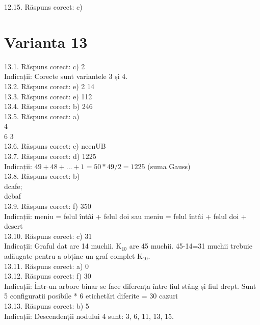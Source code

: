 12.15. Răspuns corect: c)\\

\section*{Varianta 13}

13.1. Răspuns corect: c) 2\\
Indicații: Corecte sunt variantele 3 și 4.\\

13.2. Răspuns corect: e) 2 14\\

13.3. Răspuns corect: e) 112\\

13.4. Răspuns corect: b) 246\\

13.5. Răspuns corect: a)\\4\\6 3\\

13.6. Răspuns corect: c) neenUB\\

13.7. Răspuns corect: d) 1225\\
Indicații: $49+48+...+1=50*49/2=1225$ (suma Gauss)\\

13.8. Răspuns corect: b)\\dcafe;\\dcbaf\\

13.9. Răspuns corect: f) 350\\
Indicații: meniu = felul întâi + felul doi sau meniu = felul întâi + felul doi + desert\\

13.10. Răspuns corect: c) 31\\
Indicații: Graful dat are 14 muchii. $\mathrm{K}_{10}$ are 45 muchii. 45-14=31 muchii trebuie adăugate pentru a obține un graf complet $\mathrm{K}_{10}$.\\

13.11. Răspuns corect: a) 0\\

13.12. Răspuns corect: f) 30\\
Indicații: Într-un arbore binar se face diferența între fiul stâng și fiul drept. Sunt 5 configurații posibile * 6 etichetări diferite = 30 cazuri\\

13.13. Răspuns corect: b) 5\\
Indicații: Descendenții nodului 4 sunt: 3, 6, 11, 13, 15.\\

